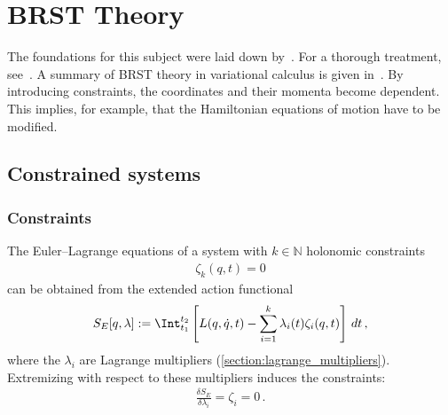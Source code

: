 \chapter{BRST Theory}\label{chapter:constrained_dynamics}

    The foundations for this subject were laid down by~\cite{dirac_generalized_1950}. For a thorough treatment, see~\cite{henneaux_quantization_1992}. A summary of BRST theory in variational calculus is given in~\cite{stasheff_secret_1997}. By introducing constraints, the coordinates and their momenta become dependent. This implies, for example, that the Hamiltonian equations of motion have to be modified.

    \minitoc

\section{Constrained systems}\label{section:constrained_systems}
\subsection{Constraints}

    \begin{method}
        The Euler--Lagrange equations of a system with $k\in\mathbb{N}$ holonomic constraints
        \begin{gather}
            \zeta_k(q,t)=0
        \end{gather}
        can be obtained from the extended action functional
        \begin{gather}
            S_E[q,\lambda]:=\Int_{t_1}^{t_2}\left[L(q,\dot{q},t) - \sum_{i=1}^k\lambda_i(t)\zeta_i(q,t)\right]\,dt\,,
        \end{gather}
        where the $\lambda_i$ are Lagrange multipliers (\cref{section:lagrange_multipliers}). Extremizing with respect to these multipliers induces the constraints:
        \begin{gather}
            \frac{\delta S_E}{\delta\lambda_i}=\zeta_i=0\,.
        \end{gather}
    \end{method}

